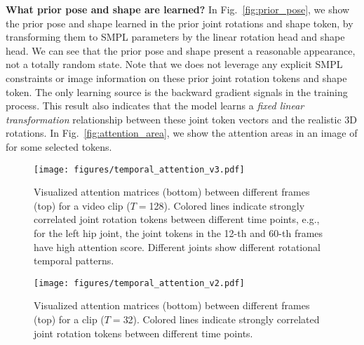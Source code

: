 {\bf What prior pose and shape are learned?} 
In Fig.~\ref{fig:prior_pose}, we show the prior pose and shape learned in the prior joint rotations and shape token, by transforming them to SMPL parameters by the linear rotation head and shape head. 
We can see that the prior pose and shape present a reasonable appearance, not a totally random state.
Note that we does not leverage any explicit SMPL constraints or image information on these prior joint rotation tokens and shape token. 
The only learning source is the backward gradient signals in the training process. This result also indicates that the model learns a \textit{fixed linear transformation} relationship between these joint token vectors and the realistic 3D rotations. 
In Fig.~\ref{fig:attention_area}, we show the attention areas in an image of for some selected tokens. 

\begin{figure}[h]
	\centering
	\texttt{[image: figures/temporal\_attention\_v3.pdf]}\vspace{-0.1in}
	\caption{Visualized attention matrices (bottom) between different frames (top) for a video clip ($T=$128). Colored lines indicate strongly correlated joint rotation tokens between different time points, e.g., for the left hip joint, the joint tokens in the 12-th and 60-th frames have high attention score. Different joints show different rotational temporal patterns.}
	\label{fig:temporal_attention_h36m}\vspace{-0.1in}
\end{figure}

\begin{figure}[h]
	\centering
	\texttt{[image: figures/temporal\_attention\_v2.pdf]}
	\caption{Visualized attention matrices (bottom) between different frames (top) for a clip ($T=$32). Colored lines indicate strongly correlated joint rotation tokens between different time points. }
	\label{fig:temporal_attention_posetrack}\vspace{-0.1in}
\end{figure}

